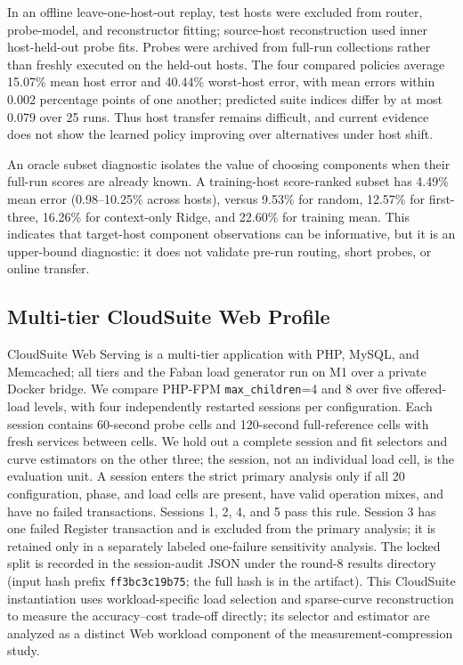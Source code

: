 \documentclass[sigconf, review, anonymous, balance=false]{acmart}
\begin{document}
In an offline leave-one-host-out replay, test hosts were excluded from router, probe-model, and reconstructor fitting; source-host reconstruction used inner host-held-out probe fits. Probes were archived from full-run collections rather than freshly executed on the held-out hosts. The four compared policies average 15.07\% mean host error and 40.44\% worst-host error, with mean errors within 0.002 percentage points of one another; predicted suite indices differ by at most 0.079 over 25 runs. Thus host transfer remains difficult, and current evidence does not show the learned policy improving over alternatives under host shift.

An oracle subset diagnostic isolates the value of choosing components when their full-run scores are already known. A training-host score-ranked subset has 4.49\% mean error (0.98--10.25\% across hosts), versus 9.53\% for random, 12.57\% for first-three, 16.26\% for context-only Ridge, and 22.60\% for training mean. This indicates that target-host component observations can be informative, but it is an upper-bound diagnostic: it does not validate pre-run routing, short probes, or online transfer.

\subsection{Multi-tier CloudSuite Web Profile}
\label{subsec:http-pilot}
CloudSuite Web Serving is a multi-tier application with PHP, MySQL, and Memcached; all tiers and the Faban load generator run on M1 over a private Docker bridge. We compare PHP-FPM \texttt{max\_children}=4 and 8 over five offered-load levels, with four independently restarted sessions per configuration. Each session contains 60-second probe cells and 120-second full-reference cells with fresh services between cells. We hold out a complete session and fit selectors and curve estimators on the other three; the session, not an individual load cell, is the evaluation unit. A session enters the strict primary analysis only if all 20 configuration, phase, and load cells are present, have valid operation mixes, and have no failed transactions. Sessions 1, 2, 4, and 5 pass this rule. Session 3 has one failed Register transaction and is excluded from the primary analysis; it is retained only in a separately labeled one-failure sensitivity analysis. The locked split is recorded in the session-audit JSON under the round-8 results directory (input hash prefix \texttt{ff3bc3c19b75}; the full hash is in the artifact). This CloudSuite instantiation uses workload-specific load selection and sparse-curve reconstruction to measure the accuracy--cost trade-off directly; its selector and estimator are analyzed as a distinct Web workload component of the measurement-compression study.
\end{document}
